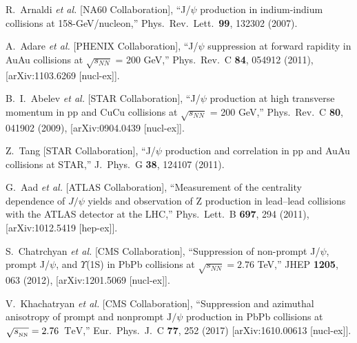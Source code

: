 \documentclass[12pt,a4paper,final]{iopart} %
\newcommand{\Jpsi}{J/\psi}
\begin{document}
\begin{thebibliography}{100}
  R.~Arnaldi {\it et al.} [NA60 Collaboration],
  ``J/$\psi$ production in indium-indium collisions at 158-GeV/nucleon,''
  Phys.\ Rev.\ Lett.\ {\bf 99}, 132302 (2007).
  

A.~Adare {\it et al.}  [PHENIX Collaboration],
  ``J/$\psi$ suppression at forward rapidity in AuAu collisions at $\sqrt{s_{NN}}$ = 200 GeV,''
  Phys.\ Rev.\ C {\bf 84}, 054912 (2011), [arXiv:1103.6269 [nucl-ex]].

  B.~I.~Abelev {\it et al.} [STAR Collaboration],
  ``J/$\psi$ production at high transverse momentum in pp and CuCu collisions at  $\sqrt{s_{NN}}$ = 200 GeV,''
  Phys.\ Rev.\ C {\bf 80}, 041902 (2009), [arXiv:0904.0439 [nucl-ex]].

  Z.~Tang [STAR Collaboration],
  ``J/$\psi$ production and correlation in pp and AuAu collisions at STAR,''
  J.\ Phys.\ G {\bf 38}, 124107 (2011).

  
  G.~Aad {\it et al.} [ATLAS Collaboration],
  ``Measurement of the centrality dependence of $\Jpsi$ yields and observation of Z production in 
  lead–lead collisions with the ATLAS detector at the LHC,''
  Phys.\ Lett.\ B {\bf 697}, 294 (2011), [arXiv:1012.5419 [hep-ex]].




  S.~Chatrchyan {\it et al.}  [CMS Collaboration],
  ``Suppression of non-prompt J/$\psi$, prompt J/$\psi$, and $\Upsilon$(1S) in PbPb collisions at $\sqrt{s_{NN}}=2.76$ TeV,''
  JHEP {\bf 1205}, 063 (2012), [arXiv:1201.5069 [nucl-ex]].

  V.~Khachatryan {\it et al.} [CMS Collaboration],
  ``Suppression and azimuthal anisotropy of prompt and nonprompt ${\mathrm{J}}/\psi $ production in PbPb collisions at $\sqrt{{s_{_{{\rm NN}}}}} =2.76$ $\,\mathrm{TeV}$,'' Eur.\ Phys.\ J.\ C {\bf 77}, 252 (2017)
  [arXiv:1610.00613 [nucl-ex]].






\end{thebibliography}
\end{document}
